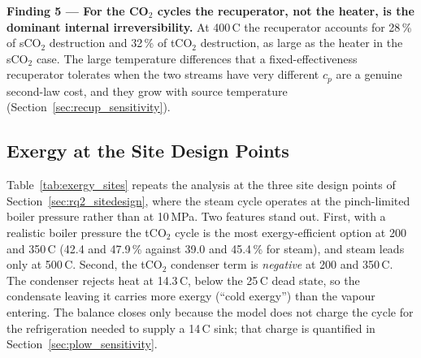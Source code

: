 \documentclass[12pt,a4paper]{report}
\begin{document}
\begin{findingbox}
\textbf{Finding 5 --- For the CO$_2$ cycles the recuperator, not the heater,
is the dominant internal irreversibility.}
At 400\,\textdegree C the recuperator accounts for 28\,\% of sCO$_2$
destruction and 32\,\% of tCO$_2$ destruction, as large as the heater in the
sCO$_2$ case. The large temperature differences that a fixed-effectiveness
recuperator tolerates when the two streams have very different $c_p$ are a
genuine second-law cost, and they grow with source temperature
(Section~\ref{sec:recup_sensitivity}).
\end{findingbox}

\subsection{Exergy at the Site Design Points}

Table~\ref{tab:exergy_sites} repeats the analysis at the three site design
points of Section~\ref{sec:rq2_sitedesign}, where the steam cycle operates at
the pinch-limited boiler pressure rather than at 10\,MPa. Two features stand
out. First, with a realistic boiler pressure the tCO$_2$ cycle is the most
exergy-efficient option at 200 and 350\,\textdegree C (42.4 and 47.9\,\%
against 39.0 and 45.4\,\% for steam), and steam leads only at 500\,\textdegree C.
Second, the tCO$_2$ condenser term is \emph{negative} at 200 and
350\,\textdegree C. The condenser rejects heat at 14.3\,\textdegree C, below
the 25\,\textdegree C dead state, so the condensate leaving it carries more
exergy (``cold exergy'') than the vapour entering. The balance closes only
because the model does not charge the cycle for the refrigeration needed to
supply a 14\,\textdegree C sink; that charge is quantified in
Section~\ref{sec:plow_sensitivity}.
\end{document}
